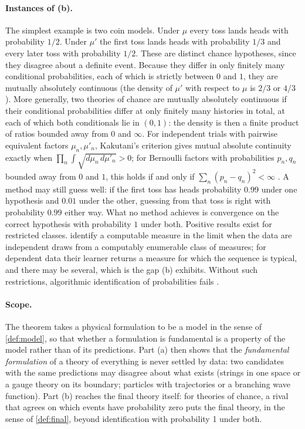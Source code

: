 \paragraph{Instances of (b).}
The simplest example is two coin models. Under $\mu$ every toss lands heads with
probability $1/2$. Under $\mu'$ the first toss lands heads with probability $1/3$ and
every later toss with probability $1/2$. These are distinct chance hypotheses, since
they disagree about a definite event. Because they differ in only finitely many
conditional probabilities, each of which is strictly between $0$ and $1$, they are
mutually absolutely continuous (the density of $\mu'$ with respect to $\mu$ is $2/3$ or
$4/3$). More generally, two theories of chance are mutually absolutely continuous if
their conditional probabilities differ at only finitely many histories in total, at
each of which both conditionals lie in $(0,1)$: the density is then a finite product of
ratios bounded away from $0$ and $\infty$. For independent trials with pairwise equivalent
factors $\mu_n,\mu'_n$, Kakutani's criterion gives mutual absolute continuity exactly
when $\prod_n\int\sqrt{d\mu_n\,d\mu'_n}>0$; for Bernoulli factors with probabilities
$p_n,q_n$ bounded away from $0$ and $1$, this holds if and only if
$\sum_n(p_n-q_n)^2<\infty$ \citep{kakutani1948}. A method may still guess well: if the
first toss has heads probability $0.99$ under one hypothesis and $0.01$ under the other,
guessing from that toss is right with probability $0.99$ either way. What no method
achieves is convergence on the correct hypothesis with probability $1$ under both.
Positive results exist for restricted classes.  identify a
computable measure in the limit when the data are independent draws from a
computably enumerable class of measures; for dependent data their learner returns a
measure for which the sequence is typical, and there may be several, which is the gap
(b) exhibits. Without such restrictions, algorithmic identification of probabilities
fails \citep{bienvenu2018}.

\paragraph{Scope.}
The theorem takes a physical formulation to be a model in the sense of \cref{def:model},
so that whether a formulation is fundamental is a property of the model rather than of
its predictions. Part (a) then shows that the \emph{fundamental formulation} of a theory
of everything is never settled by data: two candidates with the same predictions may
disagree about what exists (strings in one space or a gauge theory on its boundary;
particles with trajectories or a branching wave function). Part (b) reaches the final
theory itself: for theories of chance, a rival that agrees on which events have
probability zero puts the final theory, in the sense of \cref{def:final}, beyond
identification with probability 1 under both.
